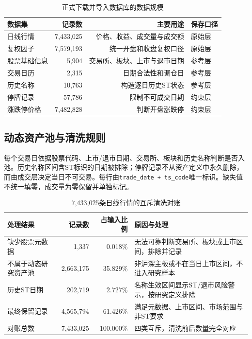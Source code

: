 \documentclass[10.5pt,a4paper]{ctexart}
\newcommand{\code}[1]{\texttt{\small #1}}
\begin{document}
\begin{table}[H]\centering\small
\caption{正式下载并导入数据库的数据规模}
\begin{tabular}{lrrl}
\toprule 数据集 & 记录数 & 主要用途 & 保存口径\\\midrule
日线行情 & 7,433,025 & 价格、收益、成交量与成交额 & 原始层\\
复权因子 & 7,579,193 & 统一开盘和收盘复权口径 & 原始层\\
股票基础信息 & 5,904 & 交易所、板块、上市与退市日期 & 参考层\\
交易日历 & 2,315 & 日期合法性和调仓日 & 参考层\\
历史名称 & 10,763 & 构造逐日历史ST状态 & 参考层\\
停牌记录 & 57,786 & 限制不可成交日期 & 约束层\\
涨跌停价格 & 7,482,828 & 判断开盘涨跌停 & 约束层\\\bottomrule
\end{tabular}
\end{table}

\subsection{动态资产池与清洗规则}
每个交易日依据股票代码、上市/退市日期、交易所、板块和历史名称判断是否入池。历史名称区间含ST标识的日期被排除；停牌记录不从资产定义中永久删除，而由成交层决定当日不可交易。每行由\code{trade\_date + ts\_code}唯一标识。缺失值不统一填零，成交量为零保留并单独标记。

\begin{table}[H]\centering\small
\caption{7,433,025条日线行情的互斥清洗对账}
\begin{tabular}{lrrp{6.2cm}}
\toprule 处理结果 & 记录数 & 占输入比例 & 原因与处理\\\midrule
缺少股票元数据 & 1,337 & 0.018\% & 无法可靠判断交易所、板块或上市区间，排除并记录\\
不属于动态研究资产池 & 2,663,175 & 35.829\% & 非沪深主板或不在当日上市区间，不进入研究样本\\
历史ST日期 & 202,719 & 2.727\% & 名称生效区间显示ST/退市风险警示，按研究定义排除\\
最终保留记录 & 4,565,794 & 61.426\% & 满足元数据、上市区间、市场范围与非ST要求\\\midrule
对账总数 & 7,433,025 & 100.000\% & 四类互斥，清洗前后数量完全对应\\\bottomrule
\end{tabular}
\end{table}
\end{document}
